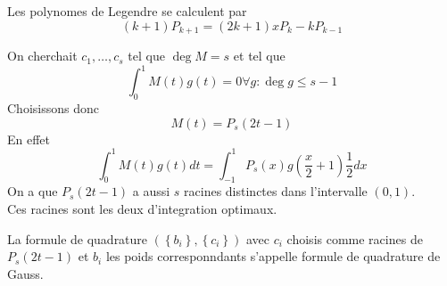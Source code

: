\documentclass[../main.tex]{subfiles}
\begin{document}
\begin{lemma}
Les polynomes de Legendre se calculent par 
\[ 
	( k+1) P_{k+1} = ( 2k+1) x P_k - k P_{k-1} 
\]

\end{lemma}
On cherchait $c_1,\ldots, c_s$ tel que $\deg M = s$ et tel que
\[ 
\int_{ 0 }^{ 1 }M( t) g( t) =0 \forall g: \deg g \leq s-1
\]
Choisissons donc
\[ 
M( t) = P_s( 2t-1) 
\]
En effet
\[ 
\int_{ 0 }^{ 1 } M( t) g( t) dt = \int_{ -1 }^{ 1 }P_s( x) g( \frac{x}{2}+1) \frac{1}{2}dx
\]
On a que $P_s( 2t-1) $ a aussi $s$ racines distinctes dans l'intervalle $( 0,1) $.\\
Ces racines sont les deux d'integration optimaux.
\begin{defn}
	La formule de quadrature $ ( \left\{ b_i \right\} , \left\{ c_i \right\} ) $ avec $c_i$ choisis comme racines de $P_s( 2t-1) $ et $b_i$ les poids corresponndants s'appelle formule de quadrature de Gauss.
\end{defn}
\end{document}
